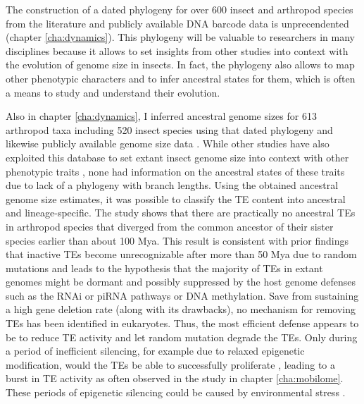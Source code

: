 The construction of a dated phylogeny for over 600 insect and arthropod
species from the literature and publicly available DNA barcode data is
unprecendented (chapter \ref{cha:dynamics}). This phylogeny will be
valuable to researchers in many disciplines because it allows to set
insights from other studies into context with the evolution of genome
size in insects.  In fact, the phylogeny also allows to map other
phenotypic characters and to infer ancestral states for them, which is
often a means to study and understand their evolution.

Also in chapter \ref{cha:dynamics}, I inferred ancestral genome sizes
for 613 arthropod taxa including 520 insect species using that dated
phylogeny and likewise publicly available genome size data
\citep{Gregory2018}. While other studies have also exploited this
database to set extant insect genome size into context with other
phenotypic traits \citep{Alfsnes2017, Gregory2011}, none had information
on the ancestral states of these traits due to lack of a phylogeny with
branch lengths. Using the obtained ancestral genome size estimates, it
was possible to classify the TE content into ancestral and
lineage-specific. The study shows that there are practically no
ancestral TEs in arthropod species that diverged from the common
ancestor of their sister species earlier than about 100 Mya. This result
is consistent with prior findings that inactive TEs become
unrecognizable after more than 50 Mya due to random mutations
\citep{Shedlock2000} and leads to the hypothesis that the majority of
TEs in extant genomes might be dormant and possibly suppressed by the
host genome defenses such as the RNAi or piRNA pathways or DNA
methylation. Save from sustaining a high gene deletion rate (along with
its drawbacks), no mechanism for removing TEs has been identified in
eukaryotes. Thus, the most efficient defense appears to be to reduce TE
activity and let random mutation degrade the TEs.  Only during a period
of inefficient silencing, for example due to relaxed epigenetic
modification, would the TEs be able to successfully proliferate
\citep{Slotkin2007, Zeh2009, Rebollo2010}, leading to a burst in TE
activity as often observed in the study in chapter \ref{cha:mobilome}.
These periods of epigenetic silencing could be caused by environmental
stress \citep{Horvath2017, Horvath2017-1}.

